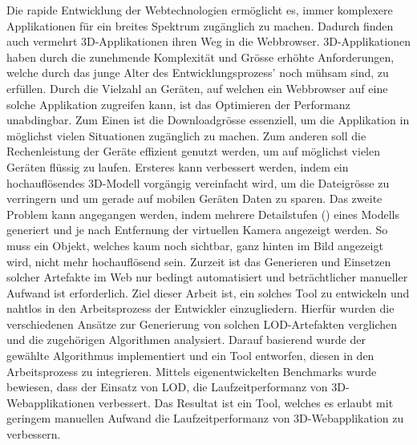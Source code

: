 Die rapide Entwicklung der Webtechnologien ermöglicht es, immer komplexere Applikationen für ein breites Spektrum zugänglich zu machen. Dadurch finden auch vermehrt 3D-Applikationen ihren Weg in die Webbrowser.
3D-Applikationen haben durch die zunehmende Komplexität und Grösse erhöhte Anforderungen, welche durch das junge Alter des Entwicklungsprozess' noch mühsam sind, zu erfüllen.
Durch die Vielzahl an Geräten, auf welchen ein Webbrowser auf eine solche Applikation zugreifen kann, ist das Optimieren der Performanz unabdingbar.
Zum Einen ist die Downloadgrösse essenziell, um die Applikation in möglichst vielen Situationen zugänglich zu machen. Zum anderen soll die Rechenleistung der Geräte effizient genutzt werden, um auf möglichst vielen Geräten flüssig zu laufen.
Ersteres kann verbessert werden, indem ein hochauflösendes 3D-Modell vorgängig vereinfacht wird, um die Dateigrösse zu verringern und um gerade auf mobilen Geräten Daten zu sparen.
Das zweite Problem kann angegangen werden, indem mehrere Detailstufen () eines Modells generiert und je nach Entfernung der virtuellen Kamera angezeigt werden. So muss ein Objekt, welches kaum noch sichtbar, ganz hinten im Bild angezeigt wird, nicht mehr hochauflösend sein.
Zurzeit ist das Generieren und Einsetzen solcher Artefakte im Web nur bedingt automatisiert und beträchtlicher manueller Aufwand ist erforderlich.
Ziel dieser Arbeit ist, ein solches Tool zu entwickeln und nahtlos in den Arbeitsprozess der Entwickler einzugliedern.
\bigbreak
Hierfür wurden die verschiedenen Ansätze zur Generierung von solchen LOD-Artefakten verglichen und die zugehörigen Algorithmen analysiert.
Darauf basierend wurde der gewählte Algorithmus implementiert und ein Tool entworfen, diesen in den Arbeitsprozess zu integrieren.
Mittels eigenentwickelten Benchmarks wurde bewiesen, dass der Einsatz von LOD, die Laufzeitperformanz von 3D-Webapplikationen verbessert.
\bigbreak
Das Resultat ist ein Tool, welches es erlaubt mit geringem manuellen Aufwand die Laufzeitperformanz von 3D-Webapplikation zu verbessern.
